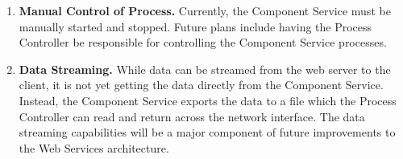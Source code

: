 %


\begin{enumerate}
\item{\bf Manual Control of Process.}
Currently, the Component Service must be manually started and stopped.  Future plans include having the Process Controller be responsible for controlling the Component Service processes.
\item{\bf Data Streaming.}
While data can be streamed from the web server to the client, it is not yet getting the data directly from the Component Service.  Instead, the Component Service exports the data to a file which the Process Controller can read and return across the network interface.  The data streaming capabilities will be a major component of future improvements to the Web Services architecture.
\end{enumerate}



